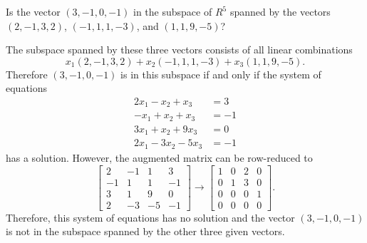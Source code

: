  Is the vector $(3,-1,0,-1)$ in the subspace of $R^5$
spanned by the vectors $(2,-1,3,2)$, $(-1,1,1,-3)$, and $(1,1,9,-5)$?
\begin{solution}
  The subspace spanned by these three vectors consists of all linear
  combinations
  \begin{equation*}
    x_1(2,-1,3,2) + x_2(-1,1,1,-3) + x_3(1,1,9,-5).
  \end{equation*}
  Therefore $(3,-1,0,-1)$ is in this subspace if and only if the
  system of equations
  \begin{align*}
    2x_1 - x_2 + x_3 &= 3 \\
    -x_1 + x_2 + x_3 &= -1 \\
    3x_1 + x_2 + 9x_3 &= 0 \\
    2x_1 - 3x_2 - 5x_3 &= -1
  \end{align*}
  has a solution. However, the augmented matrix can be row-reduced to
  \begin{equation*}
    \begin{bmatrix}
      2 & -1 & 1 & 3 \\
      -1 & 1 & 1 & -1 \\
      3 & 1 & 9 & 0 \\
      2 & -3 & -5 & -1
    \end{bmatrix}
    \rightarrow
    \begin{bmatrix}
      1 & 0 & 2 & 0 \\
      0 & 1 & 3 & 0 \\
      0 & 0 & 0 & 1 \\
      0 & 0 & 0 & 0
    \end{bmatrix}.
  \end{equation*}
  Therefore, this system of equations has no solution and the vector
  $(3,-1,0,-1)$ is not in the subspace spanned by the other three
  given vectors.
\end{solution}
